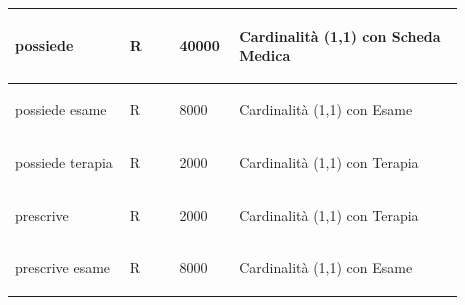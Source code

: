\documentclass[12pt,a4paper]{article}
\begin{document}
\begin{center}
\begin{longtable}{|p{0.23\linewidth}|p{0.1\linewidth}|p{0.11\linewidth}|p{0.45\linewidth}|}
\hline
possiede
 & 
\begin{center}\vspace{-25pt}R\end{center}
 & 
\begin{center}\vspace{-25pt}40000\end{center}
 & 
\begin{flushleft}\vspace{-25pt}Cardinalità (1,1) con Scheda Medica\end{flushleft}
\\

\hline
possiede esame
 & 
\begin{center}\vspace{-25pt}R\end{center}
 & 
\begin{center}\vspace{-25pt}8000\end{center}
 & 
\begin{flushleft}\vspace{-25pt}Cardinalità (1,1) con Esame\end{flushleft}
\\

\hline
possiede terapia
 & 
\begin{center}\vspace{-25pt}R\end{center}
 & 
\begin{center}\vspace{-25pt}2000\end{center}
 & 
\begin{flushleft}\vspace{-25pt}Cardinalità (1,1) con Terapia\end{flushleft}
\\

\hline
prescrive
 & 
\begin{center}\vspace{-25pt}R\end{center}
 & 
\begin{center}\vspace{-25pt}2000\end{center}
 & 
\begin{flushleft}\vspace{-25pt}Cardinalità (1,1) con Terapia\end{flushleft}
\\

\hline
prescrive esame
 & 
\begin{center}\vspace{-25pt}R\end{center}
 & 
\begin{center}\vspace{-25pt}8000\end{center}
 & 
\begin{flushleft}\vspace{-25pt}Cardinalità (1,1) con Esame\end{flushleft}
\\


\end{longtable}
\end{center}
\end{document}

